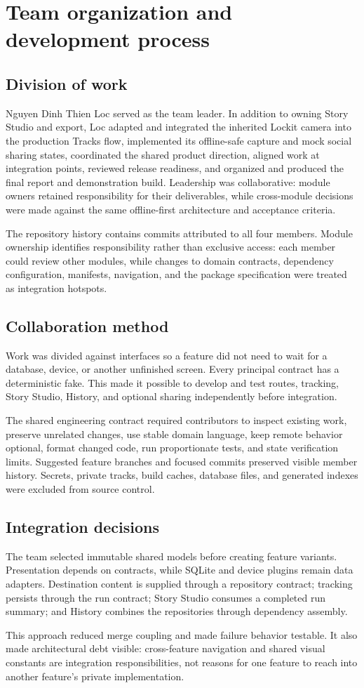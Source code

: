 \section{Team organization and development process}

\subsection{Division of work}


Nguyen Dinh Thien Loc served as the team leader. In addition to owning Story
Studio and export, Loc adapted and integrated the inherited Lockit camera into
the production Tracks flow, implemented its offline-safe capture and mock social
sharing states, coordinated the shared product direction, aligned work at
integration points, reviewed release readiness, and organized and produced the
final report and demonstration build. Leadership was collaborative: module
owners retained responsibility for their deliverables, while cross-module
decisions were made against the same offline-first architecture and acceptance
criteria.

The repository history contains commits attributed to all four members. Module
ownership identifies responsibility rather than exclusive access: each member
could review other modules, while changes to domain contracts, dependency
configuration, manifests, navigation, and the package specification were treated
as integration hotspots.

\subsection{Collaboration method}
Work was divided against interfaces so a feature did not need to wait for a
database, device, or another unfinished screen. Every principal contract has a
deterministic fake. This made it possible to develop and test routes, tracking,
Story Studio, History, and optional sharing independently before integration.

The shared engineering contract required contributors to inspect existing work,
preserve unrelated changes, use stable domain language, keep remote behavior
optional, format changed code, run proportionate tests, and state verification
limits. Suggested feature branches and focused commits preserved visible member
history. Secrets, private tracks, build caches, database files, and generated
indexes were excluded from source control.

\subsection{Integration decisions}
The team selected immutable shared models before creating feature variants.
Presentation depends on contracts, while SQLite and device plugins remain data
adapters. Destination content is supplied through a repository contract;
tracking persists through the run contract; Story Studio consumes a completed
run summary; and History combines the repositories through dependency assembly.

This approach reduced merge coupling and made failure behavior testable. It also
made architectural debt visible: cross-feature navigation and shared visual
constants are integration responsibilities, not reasons for one feature to reach
into another feature's private implementation.
